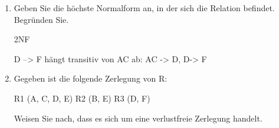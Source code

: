 \documentclass{lehramt-informatik-aufgabe}
\begin{document}
\begin{enumerate}

\item Geben Sie die höchste Normalform an, in der sich die Relation
befindet. Begründen Sie.

\begin{liAntwort}
2NF

D --> F hängt transitiv von AC ab: AC -> D, D-> F
\end{liAntwort}


\item Gegeben ist die folgende Zerlegung von R:

R1 (A, C, D, E)
R2 (B, E)
R3 (D, F)

Weisen Sie nach, dass es sich um eine verlustfreie Zerlegung handelt.

\end{enumerate}
\end{document}
